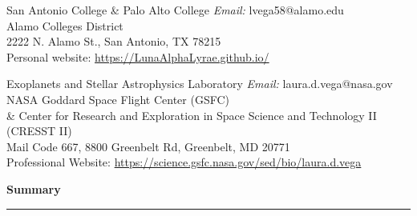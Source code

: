 \documentclass[12pt]{article}
\begin{document}
{\noindent San Antonio College \& Palo Alto College \hfill \textit{Email:} lvega58@alamo.edu \\
Alamo Colleges District \hfill \\
2222 N. Alamo St., San Antonio, TX 78215 \\
Personal website: \href{https://LunaAlphaLyrae.github.io/}{https://LunaAlphaLyrae.github.io/}
\vskip 0.08in

\vskip 0.1in

\noindent   Exoplanets and Stellar Astrophysics Laboratory \hfill \textit{Email:} laura.d.vega@nasa.gov \\ 
\noindent NASA Goddard Space Flight Center (GSFC) \\ \& Center for Research and Exploration in Space Science and Technology II (CRESST II) \hfill \\
Mail Code 667, 8800 Greenbelt Rd, Greenbelt, MD 20771 \\
Professional Website: \href{https://science.gsfc.nasa.gov/sed/bio/laura.d.vega}{https://science.gsfc.nasa.gov/sed/bio/laura.d.vega}

}
\vskip 0.1in
\noindent
{\bf Summary} \\
\vspace{-10mm}
\begin{center}
\rule{\textwidth}{0.2mm}
\end{center}
\vspace{-3mm}

\end{document}
